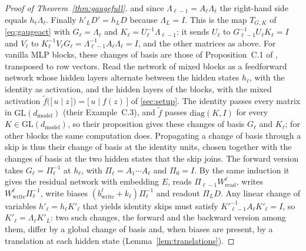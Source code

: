 \documentclass[10pt]{article}
\theoremstyle{definition}
\theoremstyle{remark}
\newcommand{\Wread}{W_{\mathrm{read}}}
\newcommand{\Wwrite}{W_{\mathrm{write}}}
\newcommand{\dm}{d_{\mathrm{model}}}
\newcommand{\GL}{\mathrm{GL}}
\begin{document}
\begin{proof}[Proof of Theorem~\ref{thm:gaugefull}]
and since $\Lambda_{\ell-1} = A_\ell\Lambda_\ell$ the right-hand side equals $h_\ell\Lambda_\ell$. Finally $h'_LD' = h_LD$ because $\Lambda_L = I$. This is the map $T_{G,K}$ of \cref{eq:gaugeact} with $G_\ell = \Lambda_\ell$ and $K_\ell = U_\ell^{-1}\Lambda_{\ell-1}$: it sends $U_\ell$ to $G_{\ell-1}^{-1}U_\ell K_\ell = I$ and $V_\ell$ to $K_\ell^{-1}V_\ell G_\ell = \Lambda_{\ell-1}^{-1}A_\ell\Lambda_\ell = I$, and the other matrices as above. For vanilla MLP blocks, these changes of basis are those of Proposition~C.1 of \citet{zhao2023symmetries}, transposed to row vectors. Read the network of mixed blocks as a feedforward network whose hidden layers alternate between the hidden states $h_\ell$, with the identity as activation, and the hidden layers of the blocks, with the mixed activation $\tilde f\big(\big[\, u \;\big|\; z \,\big]\big) = \big[\, u \;\big|\; f(z) \,\big]$ of \cref{sec:setup}. The identity passes every matrix in $\GL(\dm)$ (their Example~C.3), and $\tilde f$ passes $\mathrm{diag}(K, I)$ for every $K \in \GL(\dm)$, so their proposition gives these changes of basis $G_\ell$ and $K_\ell$; for other blocks the same computation does. Propagating a change of basis through a skip is thus their change of basis at the identity units, chosen together with the changes of basis at the two hidden states that the skip joins. The forward version takes $G_\ell = \Pi_\ell^{-1}$ at $h_\ell$, with $\Pi_\ell = A_1\cdots A_\ell$ and $\Pi_0 = I$. By the same induction it gives the residual network with embedding $E$, reads $\Pi_{\ell-1}\Wread^{\ell}$, writes $\Wwrite^{\ell}\Pi_\ell^{-1}$, write biases $(b^{\ell}_{\mathrm{write}} + k_\ell)\Pi_\ell^{-1}$ and readout $\Pi_LD$. Any linear change of variables $h'_\ell = h_\ell K'_\ell$ that yields identity skips must satisfy $K'^{-1}_{\ell-1}A_\ell K'_\ell = I$, so $K'_\ell = \Lambda_\ell K'_L$: two such changes, the forward and the backward version among them, differ by a global change of basis and, when biases are present, by a translation at each hidden state (Lemma~\ref{lem:translations}).


\end{proof}
\end{document}
